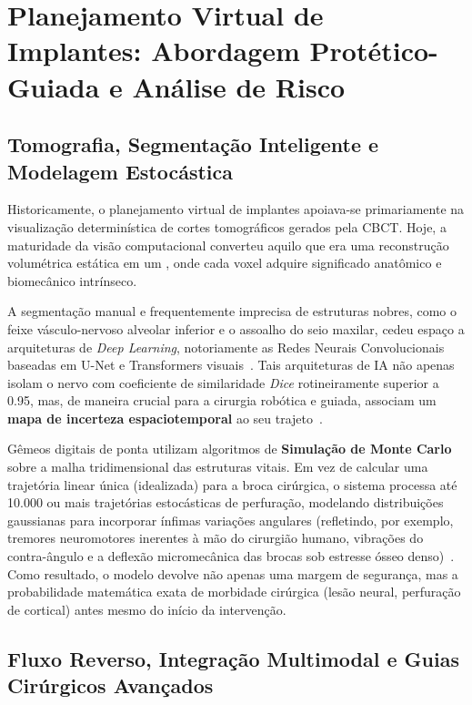 \section{Planejamento Virtual de Implantes: Abordagem Protético-Guiada e Análise de Risco}

\subsection{Tomografia, Segmentação Inteligente e Modelagem Estocástica}

Historicamente, o planejamento virtual de implantes apoiava-se primariamente na visualização determinística de cortes tomográficos gerados pela CBCT. Hoje, a maturidade da visão computacional converteu aquilo que era uma reconstrução volumétrica estática em um , onde cada voxel adquire significado anatômico e biomecânico intrínseco. 

A segmentação manual e frequentemente imprecisa de estruturas nobres, como o feixe vásculo-nervoso alveolar inferior e o assoalho do seio maxilar, cedeu espaço a arquiteturas de \textit{Deep Learning}, notoriamente as Redes Neurais Convolucionais baseadas em U-Net e Transformers visuais~\cite{elsaid2025digital}. Tais arquiteturas de IA não apenas isolam o nervo com coeficiente de similaridade \textit{Dice} rotineiramente superior a 0.95, mas, de maneira crucial para a cirurgia robótica e guiada, associam um \textbf{mapa de incerteza espaciotemporal} ao seu trajeto~\cite{katsoulakis2024digital}. 

Gêmeos digitais de ponta utilizam algoritmos de \textbf{Simulação de Monte Carlo} sobre a malha tridimensional das estruturas vitais. Em vez de calcular uma trajetória linear única (idealizada) para a broca cirúrgica, o sistema processa até 10.000 ou mais trajetórias estocásticas de perfuração, modelando distribuições gaussianas para incorporar ínfimas variações angulares (refletindo, por exemplo, tremores neuromotores inerentes à mão do cirurgião humano, vibrações do contra-ângulo e a deflexão micromecânica das brocas sob estresse ósseo denso)~\cite{zhang2024recursive}. Como resultado, o modelo devolve não apenas uma margem de segurança, mas a probabilidade matemática exata de morbidade cirúrgica (lesão neural, perfuração de cortical) antes mesmo do início da intervenção.

\subsection{Fluxo Reverso, Integração Multimodal e Guias Cirúrgicos Avançados}

